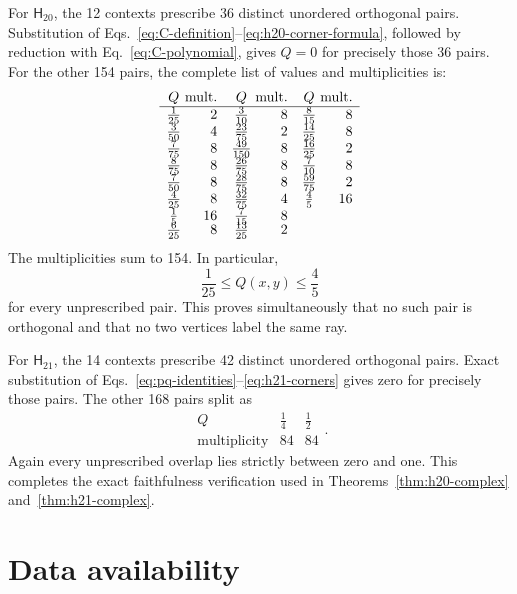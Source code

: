 \documentclass[twocolumn,aps,pra,floatfix,amsmath,amssymb,longbibliography]{revtex4-2}
\theoremstyle{definition}
\theoremstyle{remark}
\newcommand{\Htwenty}{\mathsf H_{20}}
\newcommand{\Htwentyone}{\mathsf H_{21}}
\begin{document}
For $\Htwenty$, the 12 contexts prescribe 36 distinct unordered
orthogonal pairs.  Substitution of
Eqs.~\eqref{eq:C-definition}--\eqref{eq:h20-corner-formula}, followed by
reduction with Eq.~\eqref{eq:C-polynomial}, gives $Q=0$ for precisely
those 36 pairs.  For the other 154 pairs, the complete list of values
and multiplicities is:
\begin{equation}
\begin{array}{c@{\;}r@{\quad}c@{\;}r@{\quad}c@{\;}r}
 Q&\text{mult.}&Q&\text{mult.}&Q&\text{mult.}\\ \hline
 \frac1{25}&2&\frac3{10}&8&\frac8{15}&8\\
 \frac3{50}&4&\frac{23}{75}&2&\frac{14}{25}&8\\
 \frac7{75}&8&\frac{49}{150}&8&\frac{16}{25}&2\\
 \frac8{75}&8&\frac{26}{75}&8&\frac7{10}&8\\
 \frac7{50}&8&\frac{28}{75}&8&\frac{59}{75}&2\\
 \frac4{25}&8&\frac{32}{75}&4&\frac45&16\\
 \frac15&16&\frac7{15}&8&&\\[-2pt]
 \frac6{25}&8&\frac{13}{25}&2&&
\end{array}
\label{eq:H20-Q-table}
\end{equation}
The multiplicities sum to 154.  In particular,
\begin{equation}
 \frac1{25}\le Q(x,y)\le\frac45
 \label{eq:H20-Q-bounds}
\end{equation}
for every unprescribed pair.  This proves simultaneously that no such
pair is orthogonal and that no two vertices label the same ray.

For $\Htwentyone$, the 14 contexts prescribe 42 distinct unordered
orthogonal pairs.  Exact substitution of
Eqs.~\eqref{eq:pq-identities}--\eqref{eq:h21-corners} gives zero for
precisely those pairs.  The other 168 pairs split as
\begin{equation}
 \begin{array}{c|cc}
 Q&\frac14&\frac12\\ \hline
 \text{multiplicity}&84&84
 \end{array}.
 \label{eq:H21-Q-table}
\end{equation}
Again every unprescribed overlap lies strictly between zero and one.
This completes the exact faithfulness verification used in
Theorems~\ref{thm:h20-complex} and~\ref{thm:h21-complex}.

\section*{Data availability}
\end{document}
